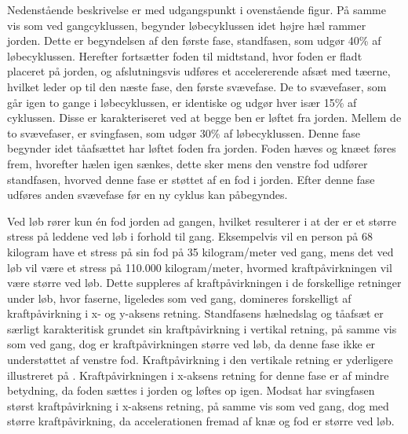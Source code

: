 Nedenstående beskrivelse er med udgangspunkt i ovenstående figur. \newline
På samme vis som ved gangcyklussen, begynder løbecyklussen idet højre hæl rammer jorden. Dette er begyndelsen af den første fase, standfasen, som udgør 40\% af løbecyklussen. Herefter fortsætter foden til midtstand, hvor foden er fladt placeret på jorden, og afslutningsvis udføres et accelererende afsæt med tæerne, hvilket leder op til den næste fase, den første svævefase. \citep{Adelaar1986,Novacheck1998} \newline
De to svævefaser, som går igen to gange i løbecyklussen, er identiske og udgør hver især 15\% af cyklussen. Disse er karakteriseret ved at begge ben er løftet fra jorden. \citep{Adelaar1986,Novacheck1998} \newline
Mellem de to svævefaser, er svingfasen, som udgør 30\% af løbecyklussen. Denne fase begynder idet tåafsættet har løftet foden fra jorden. Foden hæves og knæet føres frem, hvorefter hælen igen sænkes, dette sker mens den venstre fod udfører standfasen, hvorved denne fase er støttet af en fod i jorden. Efter denne fase udføres anden svævefase før en ny cyklus kan påbegyndes. \citep{Adelaar1986,Novacheck1998}

Ved løb rører kun én fod jorden ad gangen, hvilket resulterer i at der er et større stress på leddene ved løb i forhold til gang. Eksempelvis vil en person på 68 kilogram have et stress på sin fod på 35 kilogram/meter ved gang, mens det ved løb vil være et stress på 110.000 kilogram/meter, hvormed kraftpåvirkningen vil være større ved løb.\citep{Adelaar1986}
Dette suppleres af kraftpåvirkningen i de forskellige retninger under løb, hvor faserne, ligeledes som ved gang, domineres forskelligt af kraftpåvirkning i x- og y-aksens retning. \newline 
Standfasens hælnedslag og tåafsæt er særligt karakteritisk grundet sin kraftpåvirkning i vertikal retning, på samme vis som ved gang, dog er kraftpåvirkningen større ved løb, da denne fase ikke er understøttet af venstre fod. Kraftpåvirkning i den vertikale retning er yderligere illustreret på .\newline
Kraftpåvirkningen i x-aksens retning for denne fase er af mindre betydning, da foden sættes i jorden og løftes op igen. 
Modsat har svingfasen størst kraftpåvirkning i x-aksens retning, på samme vis som ved gang, dog med større kraftpåvirkning, da accelerationen fremad af knæ og fod er større ved løb.\citep{Rueterbories2010} 

